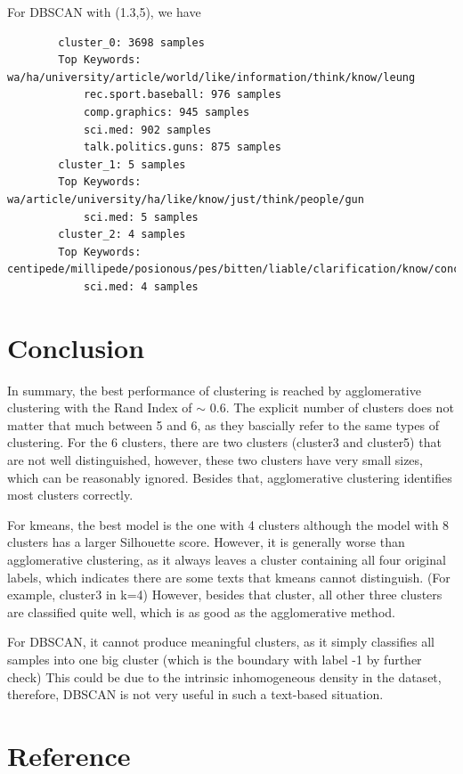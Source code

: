 \documentclass{article}
\begin{document}
    For DBSCAN with (1.3,5), we have
    \begin{Verbatim}
        cluster_0: 3698 samples
        Top Keywords: wa/ha/university/article/world/like/information/think/know/leung
            rec.sport.baseball: 976 samples
            comp.graphics: 945 samples
            sci.med: 902 samples
            talk.politics.guns: 875 samples
        cluster_1: 5 samples
        Top Keywords: wa/article/university/ha/like/know/just/think/people/gun
            sci.med: 5 samples
        cluster_2: 4 samples
        Top Keywords: centipede/millipede/posionous/pes/bitten/liable/clarification/know/concerted/soon
            sci.med: 4 samples        
    \end{Verbatim}
    





    
    
    \section{Conclusion}

    In summary, the best performance of clustering is reached by agglomerative clustering with the Rand Index of $\sim$ 0.6. The explicit number of clusters does not matter that much between 5 and 6, as they bascially refer to the same types of clustering. For the 6 clusters, there are two clusters (cluster3 and cluster5) that are not well distinguished, however, these two clusters have very small sizes, which can be reasonably ignored. Besides that, agglomerative clustering identifies most clusters correctly. 

    For kmeans, the best model is the one with 4 clusters although the model with 8 clusters has a larger Silhouette score. However, it is generally worse than agglomerative clustering, as it always leaves a cluster containing all four original labels, which indicates there are some texts that kmeans cannot distinguish. (For example, cluster3 in k=4) However, besides that cluster, all other three clusters are classified quite well, which is as good as the agglomerative method.

    For DBSCAN, it cannot produce meaningful clusters, as it simply classifies all samples into one big cluster (which is the boundary with label -1 by further check) 
    This could be due to the intrinsic inhomogeneous density in the dataset, therefore, DBSCAN is not very useful in such a text-based situation.

    \section{Reference}
\end{document}
